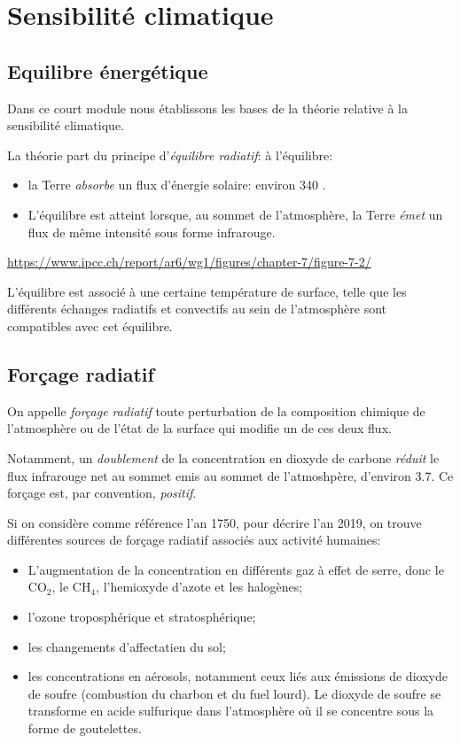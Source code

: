 \section{Sensibilit\'e climatique}

\subsection{Equilibre énergétique}

Dans ce court module nous établissons les bases de la théorie relative à la sensibilité climatique. 

La théorie part du principe d'\emph{équilibre radiatif}:
à l'équilibre:

\begin{itemize}
  \item la Terre \emph{absorbe} un flux d'énergie solaire: environ 340 \wmm. 
  \item L'équilibre est atteint lorsque, au sommet de l'atmosphère, la Terre \emph{émet} un flux de même intensité sous forme infrarouge. 
\end{itemize}

\url{https://www.ipcc.ch/report/ar6/wg1/figures/chapter-7/figure-7-2/}

L'équilibre est associé à une certaine température de surface, telle que les différents échanges radiatifs et convectifs au sein de l'atmosphère sont compatibles avec cet équilibre. 


\subsection{Forçage radiatif}

On appelle \emph{forçage radiatif} toute perturbation de la composition chimique de l'atmosphère ou de l'état de la surface qui modifie un de ces deux flux. 

Notamment, un \emph{doublement} de la concentration en dioxyde de carbone \emph{réduit} le flux infrarouge net au sommet emis au sommet de l'atmoshpère, d'environ 3.7\wmm. Ce forçage est, par convention, \emph{positif}. 


Si on considère comme référence l'an 1750, pour décrire l'an 2019, on trouve différentes sources de forçage radiatif associés aux activité humaines:  

\begin{itemize}
\item L'augmentation de la concentration en différents gaz à effet de serre, donc le CO$_2$, le CH$_4$, l'hemioxyde d'azote et les halogènes;
\item l'ozone troposphérique et stratosphérique;
\item les changements d'affectatien du sol;
\item les concentrations en aérosols, notamment  ceux liés aux émissions de dioxyde de soufre (combustion du charbon et du fuel lourd). Le dioxyde de soufre se transforme en acide sulfurique dans l'atmosphère où il se concentre sous la forme de goutelettes. 
\end{itemize}


